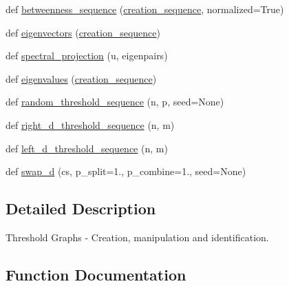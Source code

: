 \begin{DoxyCompactItemize}
\item 
def \hyperlink{namespacenetworkx_1_1algorithms_1_1threshold_a54e55c1c531842e62260691227dceddf}{betweenness\+\_\+sequence} (\hyperlink{namespacenetworkx_1_1algorithms_1_1threshold_a0b9028c3c0a3a2fda4bf3b836189d3dc}{creation\+\_\+sequence}, normalized=True)
\item 
def \hyperlink{namespacenetworkx_1_1algorithms_1_1threshold_a99b59a1ee1b0881a25fe09af9c935d42}{eigenvectors} (\hyperlink{namespacenetworkx_1_1algorithms_1_1threshold_a0b9028c3c0a3a2fda4bf3b836189d3dc}{creation\+\_\+sequence})
\item 
def \hyperlink{namespacenetworkx_1_1algorithms_1_1threshold_a19415f0520a02f2ca7b565aba31355d9}{spectral\+\_\+projection} (u, eigenpairs)
\item 
def \hyperlink{namespacenetworkx_1_1algorithms_1_1threshold_a797878f69758f67495d1854275abf650}{eigenvalues} (\hyperlink{namespacenetworkx_1_1algorithms_1_1threshold_a0b9028c3c0a3a2fda4bf3b836189d3dc}{creation\+\_\+sequence})
\item 
def \hyperlink{namespacenetworkx_1_1algorithms_1_1threshold_ae40d1e006d0930b9ecaeaa6619336d89}{random\+\_\+threshold\+\_\+sequence} (n, p, seed=None)
\item 
def \hyperlink{namespacenetworkx_1_1algorithms_1_1threshold_a680cc5ce051b5470709f290b460464e2}{right\+\_\+d\+\_\+threshold\+\_\+sequence} (n, m)
\item 
def \hyperlink{namespacenetworkx_1_1algorithms_1_1threshold_adf0e6232450ae760683623c67036f513}{left\+\_\+d\+\_\+threshold\+\_\+sequence} (n, m)
\item 
def \hyperlink{namespacenetworkx_1_1algorithms_1_1threshold_a0048b193ccb63bedfa1565170bdf6283}{swap\+\_\+d} (cs, p\+\_\+split=1., p\+\_\+combine=1., seed=None)
\end{DoxyCompactItemize}


\subsection{Detailed Description}
\begin{DoxyVerb}Threshold Graphs - Creation, manipulation and identification.
\end{DoxyVerb}
 

\subsection{Function Documentation}
\mbox{\label{namespacenetworkx_1_1algorithms_1_1threshold_a54e55c1c531842e62260691227dceddf}} 
